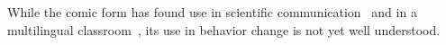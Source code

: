 
While the comic form has found use in scientific communication~\cite{McDermottPB18} and in a multilingual classroom~\cite{cary2004going}, its use in behavior change is not yet well understood.

